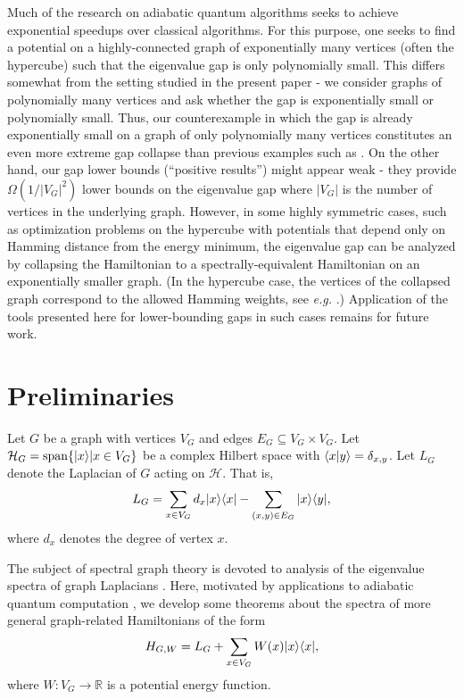 Much of the research on adiabatic quantum algorithms seeks to achieve
exponential speedups over classical algorithms. For this purpose, one
seeks to find a potential on a highly-connected graph of exponentially
many vertices (often the hypercube) such that the eigenvalue gap is
only polynomially small. This differs somewhat from the setting
studied in the present paper - we consider graphs of polynomially many
vertices and ask whether the gap is exponentially small or
polynomially small. Thus, our counterexample in which the gap is
already exponentially small on a graph of only polynomially many
vertices constitutes an even more extreme gap collapse than previous
examples such as \cite{AKR10}. On the other hand, our gap lower bounds
(``positive results'') might appear weak - they provide
$\Omega(1/|V_G|^2)$ lower bounds on the eigenvalue gap where $|V_G|$ is
the number of vertices in the underlying graph. However, in some
highly symmetric cases, such as optimization problems on the hypercube
with potentials that depend only on Hamming distance from the energy
minimum, the eigenvalue gap can be analyzed by collapsing the
Hamiltonian to a spectrally-equivalent Hamiltonian on an exponentially
smaller graph. (In the hypercube case, the vertices of the collapsed
graph correspond to the allowed Hamming weights, see \emph{e.g.}
\cite{Jarret_Jordan}.) Application of the tools presented here for
lower-bounding gaps in such cases remains for future work.

\section{Preliminaries}
\label{sec:preliminaries}

Let $G$ be a graph with vertices $V_G$ and edges $E_G \subseteq V_G
\times V_G$. Let $\mathcal{H}_G = \mathrm{span} \{ |x\rangle | x \in V_G \}$ be
a complex Hilbert space with $\langle x|y\rangle = \delta_{x,y}$. Let $L_G$
denote the Laplacian of $G$ acting on $\mathcal{H}$. That is,
\begin{equation}
L_G = \sum_{x \in V_G} d_x |x\rangle \langle x| - \sum_{(x,y) \in E_G} |x\rangle \langle y|,
\end{equation}
where $d_x$ denotes the degree of vertex $x$. 

The subject of spectral graph theory is devoted to analysis of the
eigenvalue spectra of graph Laplacians \cite{Chung}. Here,
motivated by applications to adiabatic quantum computation
\cite{Farhi_science}, we develop some theorems about the spectra of
more general graph-related Hamiltonians of the form
\begin{equation}
\label{HGW}
H_{G,W} = L_G + \sum_{x \in V_G} W(x) |x\rangle \langle x|,
\end{equation}
where $W:V_G \to \mathbb{R}$ is a potential energy
function. 

